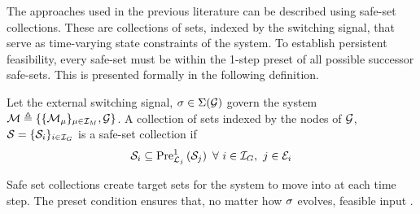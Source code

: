 The approaches used in the previous literature can be described using safe-set collections. These are collections of sets, indexed by the switching signal, that serve as time-varying state constraints of the system. To establish persistent feasibility, every safe-set must be within the 1-step preset of all possible successor safe-sets. This is presented formally in the following definition.
\begin{definition}
Let the external switching signal, $\ss\in\Sigma(\graph)$ govern the system $\modes\triangleq\{\{\mode{\modeidx}\}_{\modeidx\in\idxset{\nummodes}}, \graph\}$. A collection of sets indexed by the nodes of $\graph$, $\mathcal{S}=\{\mathcal{S}_{i}\}_{i\in\idxset{\gnumnodes}}$ is a safe-set collection if
$$\mathcal{S}_{i}\subseteq\Pre[\gnodelabel{j}][1]{\mathcal{S}_{j}}\ \forall\ i\in\idxset{\gnumnodes},\ j\in \gnodeedges{i}$$
\end{definition}
Safe set collections create target sets for the system to move into at each time step. The preset condition ensures that, no matter how $\ss$ evolves,  feasible input .
